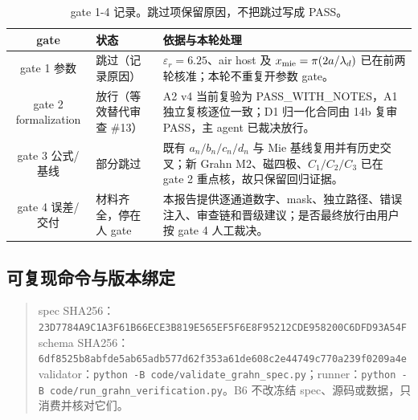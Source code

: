 \begin{table}[H]
\centering\small
\begin{tabularx}{\textwidth}{c l X}
\toprule
gate & 状态 & 依据与本轮处理 \\
\midrule
gate 1 参数 & 跳过（记录原因） & $\varepsilon_r=6.25$、air host 及 $x_{\rm mie}=\pi(2a/\lambda_d)$ 已在前两轮核准；本轮不重复开参数 gate。 \\
gate 2 formalization & 放行（等效替代审查 \#13） & A2 v4 当前复验为 PASS\_WITH\_NOTES，A1 独立复核逐位一致；D1 归一化合同由 14b 复审 PASS，主 agent 已裁决放行。 \\
gate 3 公式/基线 & 部分跳过 & 既有 $a_n/b_n/c_n/d_n$ 与 Mie 基线复用并有历史交叉；新 Grahn M2、磁四极、$C_1/C_2/C_3$ 已在 gate 2 重点核，故只保留回归证据。 \\
gate 4 误差/交付 & 材料齐全，停在人 gate & 本报告提供逐通道数字、mask、独立路径、错误注入、审查链和晋级建议；是否最终放行由用户按 gate 4 人工裁决。 \\
\bottomrule
\end{tabularx}
\caption{gate 1-4 记录。跳过项保留原因，不把跳过写成 PASS。}
\end{table}

\subsection{可复现命令与版本绑定}

\begin{quote}\small
spec SHA256：\\
\texttt{23D7784A9C1A3F61B66ECE3B819E565EF5F6E8F95212CDE958200C6DFD93A54F}\\
schema SHA256：\\
\texttt{6df8525b8abfde5ab65adb577d62f353a61de608c2e44749c770a239f0209a4e}\\
validator：\texttt{python -B code/validate\_grahn\_spec.py}；runner：\texttt{python -B code/run\_grahn\_verification.py}。B6 不改冻结 spec、源码或数据，只消费并核对它们。
\end{quote}
